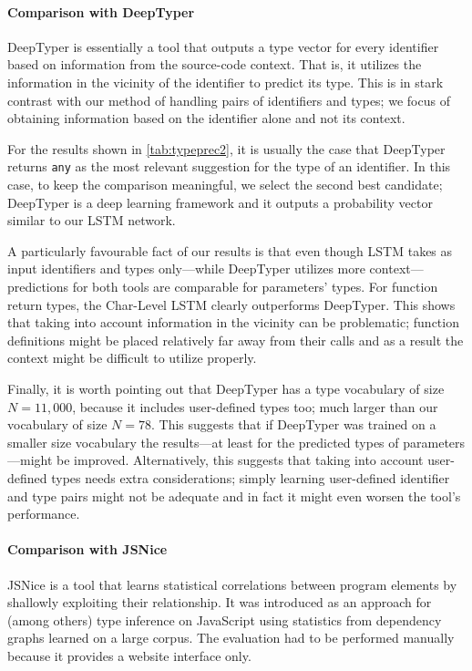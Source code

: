 \documentclass[sigplan,10pt,anonymous]{acmart} %
\theoremstyle{plain}
\theoremstyle{remark}
\theoremstyle{definition}
\begin{document}
\paragraph{Comparison with DeepTyper}

DeepTyper is essentially a tool that outputs a type vector for every identifier based on information from the source-code context.
That is, it utilizes the information in the vicinity of the identifier to predict its type.
This is in stark contrast with our method of handling pairs of identifiers and types; we focus of obtaining information based on the identifier alone and not its context.

For the results shown in \cref{tab:typeprec2}, it is usually the case that DeepTyper returns \texttt{any} as the most relevant suggestion for the type of an identifier.
In this case, to keep the comparison meaningful, we select the second best candidate; DeepTyper is a deep learning framework and it outputs a probability vector similar to our LSTM network.

A particularly favourable fact of our results is that even though LSTM takes as input identifiers and types only---while DeepTyper utilizes more context---predictions for both tools are comparable for parameters' types.
For function return types, the Char-Level LSTM clearly outperforms DeepTyper.
This shows that taking into account information in the vicinity can be problematic; function definitions might be placed relatively far away from their calls and as a result the context might be difficult to utilize properly.

Finally, it is worth pointing out that DeepTyper has a type vocabulary of size $N = 11,000$, because it includes user-defined types too; much larger than our vocabulary of size $N = 78$.
This suggests that if DeepTyper was trained on a smaller size vocabulary the results---at least for the predicted types of parameters---might be improved.
Alternatively, this suggests that taking into account user-defined types needs extra considerations; simply learning user-defined identifier and type pairs might not be adequate and in fact it might even worsen the tool's performance.

\paragraph{Comparison with JSNice}

JSNice is a tool that learns statistical correlations between program elements by shallowly exploiting their relationship.
It was introduced as an approach for (among others) type inference on JavaScript using statistics from dependency graphs learned on a large corpus.
The evaluation had to be performed manually because it provides a website interface only.
\end{document}
